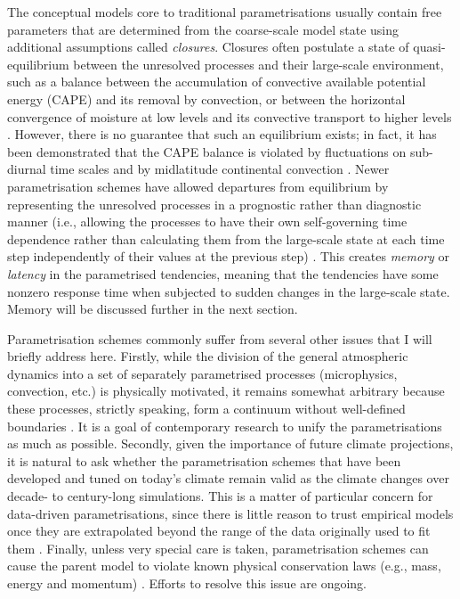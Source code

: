\documentclass[titlepage]{article}
\numberwithin{equation}{section}
\begin{document}
The conceptual models core to traditional parametrisations usually contain free
parameters that are determined from the coarse-scale model state using
additional assumptions called \emph{closures}. Closures often postulate a state
of quasi-equilibrium between the unresolved processes and their large-scale
environment, such as a balance between the accumulation of convective available
potential energy (CAPE) and its removal by convection, or between the
horizontal convergence of moisture at low levels and its convective transport
to higher levels \parencite{mcfarlane2011,christensen2022,palmer2019}. However,
there is no guarantee that such an equilibrium exists; in fact, it has been
demonstrated that the CAPE balance is violated by fluctuations on sub-diurnal
time scales \parencite{donner2003} and by midlatitude continental convection
\parencite{zhang2002}. Newer parametrisation schemes have allowed departures
from equilibrium by representing the unresolved processes in a prognostic
rather than diagnostic manner (i.e., allowing the processes to have their own
self-governing time dependence rather than calculating them from the
large-scale state at each time step independently of their values at the
previous step) \parencite{rio2019,berner2017}. This creates \emph{memory} or
\emph{latency} in the parametrised tendencies, meaning that the tendencies have
some nonzero response time when subjected to sudden changes in the large-scale
state. Memory will be discussed further in the next section.

Parametrisation schemes commonly suffer from several other issues that I will
briefly address here.
Firstly, while the division of the general atmospheric dynamics into a set of
separately parametrised processes (microphysics, convection, etc.) is
physically motivated, it remains somewhat arbitrary because these processes,
strictly speaking, form a continuum without well-defined boundaries
\parencite{christensen2022,mcfarlane2011}. It is a goal of contemporary
research to unify the parametrisations as much as possible.
Secondly, given the importance of future climate projections, it is natural to
ask whether the parametrisation schemes that have been developed and tuned on
today's climate remain valid as the climate changes over decade- to
century-long simulations. This is a matter of particular concern for
data-driven parametrisations, since there is little reason to trust empirical
models once they are extrapolated beyond the range of the data originally used
to fit them \parencite{christensen2022}.
Finally, unless very special care is taken, parametrisation schemes can cause
the parent model to violate known physical conservation laws (e.g., mass,
energy and momentum) \parencite{christensen2022}. Efforts to resolve this issue
are ongoing.
\end{document}

